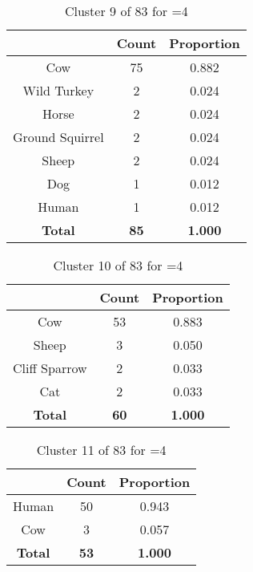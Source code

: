 \begin{table}[ht!]
\centering
\begin{tabular}{|c|c|c|}
\hline
\bf \Spec{} &\bf Count &\bf Proportion\\ \hline \hline
Cow & 75 & 0.882\\ \hline
Wild Turkey & 2 & 0.024\\ \hline
Horse & 2 & 0.024\\ \hline
Ground Squirrel & 2 & 0.024\\ \hline
Sheep & 2 & 0.024\\ \hline
Dog & 1 & 0.012\\ \hline
Human & 1 & 0.012\\ \hline
\hline
\bf Total & \bf 85 & \bf 1.000\\ \hline
\end{tabular}
\label{tab:cluster:9:4}
\caption{Cluster 9 of 83 for \minneigh{}=4}
\end{table}

\clearpage
\begin{table}[ht!]
\centering
\begin{tabular}{|c|c|c|}
\hline
\bf \Spec{} &\bf Count &\bf Proportion\\ \hline \hline
Cow & 53 & 0.883\\ \hline
Sheep & 3 & 0.050\\ \hline
Cliff Sparrow & 2 & 0.033\\ \hline
Cat & 2 & 0.033\\ \hline
\hline
\bf Total & \bf 60 & \bf 1.000\\ \hline
\end{tabular}
\label{tab:cluster:10:4}
\caption{Cluster 10 of 83 for \minneigh{}=4}
\end{table}

\begin{table}[ht!]
\centering
\begin{tabular}{|c|c|c|}
\hline
\bf \Spec{} &\bf Count &\bf Proportion\\ \hline \hline
Human & 50 & 0.943\\ \hline
Cow & 3 & 0.057\\ \hline
\hline
\bf Total & \bf 53 & \bf 1.000\\ \hline
\end{tabular}
\label{tab:cluster:11:4}
\caption{Cluster 11 of 83 for \minneigh{}=4}
\end{table}

